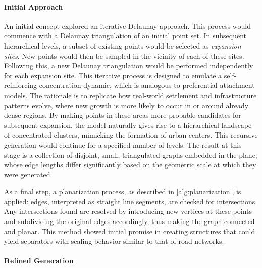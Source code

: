\paragraph{Initial Approach}

An initial concept explored an iterative Delaunay approach.
This process would commence with a Delaunay triangulation of an initial point set.
In subsequent hierarchical levels, a subset of existing points would be selected as \emph{expansion sites}.
New points would then be sampled in the vicinity of each of these sites.
Following this, a new Delaunay triangulation would be performed independently for each expansion site.
This iterative process is designed to emulate a self-reinforcing concentration dynamic, which is analogous to preferential attachment models.
The rationale is to replicate how real-world settlement and infrastructure patterns evolve, where new growth is more likely to occur in or around already dense regions.
By making points in these areas more probable candidates for subsequent expansion, the model naturally gives rise to a hierarchical landscape of concentrated clusters, mimicking the formation of urban centers.
This recursive generation would continue for a specified number of levels.
The result at this stage is a collection of disjoint, small, triangulated graphs embedded in the plane, whose edge lengths differ significantly based on the geometric scale at which they were generated.

As a final step, a planarization process, as described in \cref{alg:planarization}, is applied: edges, interpreted as straight line segments, are checked for intersections.
Any intersections found are resolved by introducing new vertices at these points and subdividing the original edges accordingly, thus making the graph connected and planar.
This method showed initial promise in creating structures that could yield separators with scaling behavior similar to that of road networks.

\paragraph{Refined Generation}

